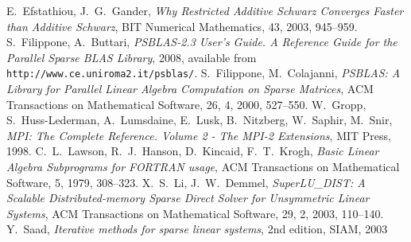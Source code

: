 \begin{thebibliography}{99}
%
E.~Efstathiou, J.~G.~Gander,
{\em Why Restricted Additive Schwarz Converges Faster than Additive Schwarz},
BIT Numerical Mathematics, 43, 2003, 945--959.
%
S.~Filippone, A.~Buttari, 
{\em PSBLAS-2.3 User's Guide. A Reference Guide for the Parallel Sparse BLAS Library}, 2008,
available from \texttt{http://www.ce.uniroma2.it/psblas/}.
%
S.~Filippone, M.~Colajanni, 
{\em PSBLAS: A Library for Parallel Linear Algebra
Computation on Sparse Matrices},
ACM Transactions on Mathematical Software, 26, 4, 2000, 527--550.
%
W.~Gropp, S.~Huss-Lederman, A.~Lumsdaine, E.~Lusk, B.~Nitzberg, W.~Saphir, M.~Snir, 
{\em MPI: The Complete Reference. Volume 2 - The MPI-2 Extensions},
MIT Press, 1998.
%
C.~L.~Lawson, R.~J.~Hanson, D.~Kincaid, F.~T.~Krogh,
\emph{Basic Linear Algebra Subprograms for FORTRAN usage},
ACM Transactions on Mathematical Software, 5, 1979, 308--323.
%
X.~S.~Li, J.~W.~Demmel, {\em SuperLU\_DIST: A Scalable Distributed-memory
Sparse Direct Solver for Unsymmetric Linear Systems},
ACM Transactions on Mathematical Software, 29, 2, 2003, 110--140.
%
%
%
%
Y.~Saad,
\emph{Iterative methods for sparse linear systems}, 2nd edition,
SIAM, 2003


\end{thebibliography}
